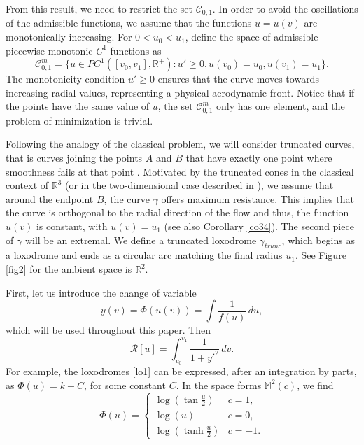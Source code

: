 \documentclass[a4paper,12pt]{amsart}
\theoremstyle{definition}
\def\r{\mathbb R}
\def\m{\mathbb M}
\begin{document}
 

From this result, we need to restrict the set $\mathcal{C}_{0,1}$.  In order to avoid the oscillations of the admissible functions, we assume that the functions $u=u(v)$ are  monotonically increasing. For $0<u_0<u_1$, define the space of admissible piecewise monotonic  $C^1$ functions as 
$$\mathcal{C}_{0,1}^m=\{ u \in PC^1([v_0,v_1],\r^+)\colon u'\geq 0,   u(v_0)=u_0, u(v_1)=u_1\}.$$ 
The monotonicity condition $u' \geq 0$ ensures that the curve  moves towards increasing radial values,   representing a physical aerodynamic front.  Notice that if the points have the same value of $u$, the set $\mathcal{C}_{0,1}^m$ only has one element, and the problem of minimization is trivial. 
 
 
 Following   the analogy of the classical problem, we will consider truncated curves, that is curves joining the points $A$ and $B$ that  have exactly one point where 
 smoothness fails at that point \cite{go}. Motivated by the truncated cones in the classical context of $\r^3$ (or in the 
 two-dimensional case described in \cite{st}), we assume that around the endpoint $B$, the 
 curve $\gamma$ offers maximum resistance. This implies that the curve is orthogonal to the radial 
 direction of the flow and thus, the function $u(v)$ is constant, with $u(v)=u_1$ (see also Corollary \ref{co34}).  The second piece of $\gamma$ will be an extremal. 
 We define a truncated loxodrome $\gamma_{trunc}$, which begins as a loxodrome and ends as a circular arc matching the final radius $u_1$. See Figure  \ref{fig2} for the ambient space is $\r^2$. 
 
 First,  let us introduce the change of variable
 $$y(v)=\Phi(u(v))=\int\frac{1}{f(u)}\, du,$$
 which will be used throughout this paper.  Then  
\begin{equation}\label{16}
\mathcal{R}[u] = \int_{v_0}^{v_1} \frac{1}{1 + y'^2} \, dv.
\end{equation}
 For example, the loxodromes \eqref{lo1} can be expressed, after an integration by parts, as $\Phi(u)=k+C$, for some constant $C$. 
In the space forms $\m^2(c)$, we find
 $$\Phi(u)=\left\{\begin{array}{ll}
 \log(\tan\frac{u}{2})& c=1,\\
 \log(u)& c=0,\\
 \log(\tanh\frac{u}{2})&c=-1.\end{array}
 \right.$$
 
\end{document}
